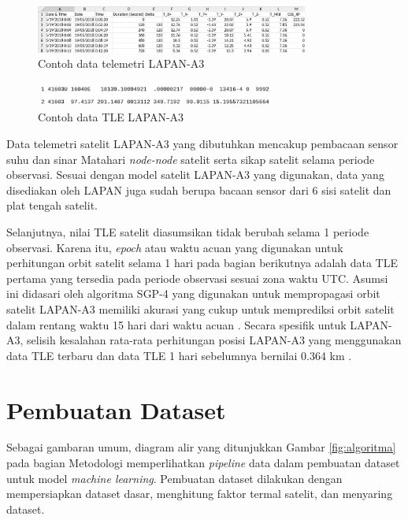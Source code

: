 \begin{figure}[H]
\setlength{}
\begin{center}
\includegraphics[width=0.8\textwidth]{fig/telea3.png}
\caption{Contoh data telemetri LAPAN-A3}
\label{fig:telea3}
\end{center}
\end{figure}

\begin{figure}[H]
\setlength{}
\begin{center}
\includegraphics[width=0.7\textwidth]{fig/tlea3.png}
\caption{Contoh data TLE LAPAN-A3}
\label{fig:tlea3}
\end{center}
\end{figure}

Data telemetri satelit LAPAN-A3 yang dibutuhkan mencakup pembacaan sensor suhu
dan sinar Matahari \textit{node-node} satelit serta sikap satelit selama
periode observasi. Sesuai dengan model satelit LAPAN-A3 yang digunakan, data
yang disediakan oleh LAPAN juga sudah berupa bacaan sensor dari 6 sisi satelit
dan plat tengah satelit.

Selanjutnya, nilai TLE satelit diasumsikan tidak berubah selama 1 periode
observasi. Karena itu, \textit{epoch} atau waktu acuan yang digunakan untuk
perhitungan orbit satelit selama 1 hari pada bagian berikutnya adalah data TLE
pertama yang tersedia pada periode observasi sesuai zona waktu UTC. Asumsi ini
didasari oleh algoritma SGP-4 yang digunakan untuk mempropagasi orbit satelit
LAPAN-A3 memiliki akurasi yang cukup untuk memprediksi orbit satelit dalam
rentang waktu 15 hari dari waktu acuan \cite{kelsoa}. Secara spesifik untuk
LAPAN-A3, selisih kesalahan rata-rata perhitungan posisi LAPAN-A3 yang
menggunakan data TLE terbaru dan data TLE 1 hari sebelumnya bernilai 0.364 km
\cite{nugroho2018}. 

\section{Pembuatan Dataset}

Sebagai gambaran umum, diagram alir yang ditunjukkan Gambar \ref{fig:algoritma}
pada bagian Metodologi memperlihatkan \textit{pipeline} data dalam pembuatan
dataset untuk model \textit{machine learning}. Pembuatan dataset dilakukan
dengan mempersiapkan dataset dasar, menghitung faktor termal satelit, dan
menyaring dataset.

